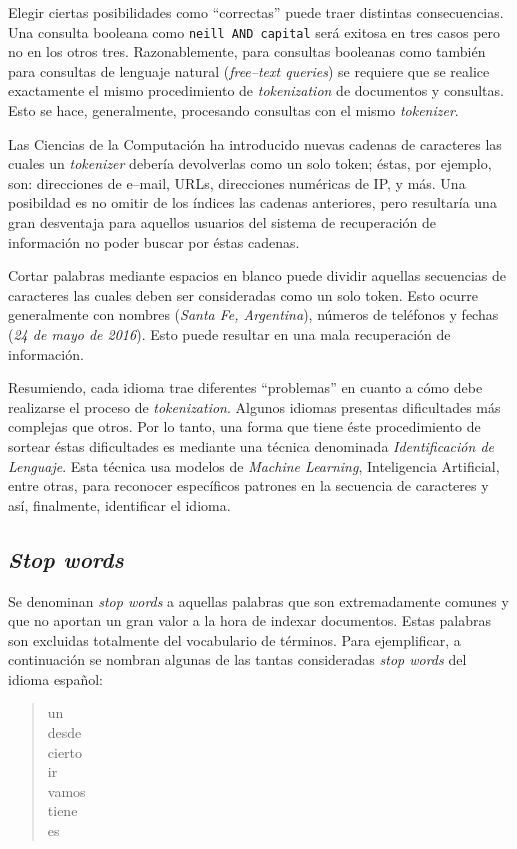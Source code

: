 		Elegir ciertas posibilidades como \enquote{correctas} puede traer distintas consecuencias. Una consulta booleana como \texttt{neill AND capital} será exitosa en tres casos pero no en los otros tres. Razonablemente, para consultas booleanas como también para consultas de lenguaje natural (\textit{free--text queries}) se requiere que se realice exactamente el mismo procedimiento de \textit{tokenization} de documentos y consultas. Esto se hace, generalmente, procesando consultas con el mismo \textit{tokenizer}. \par
		
		Las Ciencias de la Computación ha introducido nuevas cadenas de caracteres las cuales un \textit{tokenizer} debería devolverlas como un solo token; éstas, por ejemplo, son: direcciones de e--mail, URLs, direcciones numéricas de IP, y más. Una posibildad es no omitir de los índices las cadenas anteriores, pero resultaría una gran desventaja para aquellos usuarios del sistema de recuperación de información no poder buscar por éstas cadenas. \par
		
		Cortar palabras mediante espacios en blanco puede dividir aquellas secuencias de caracteres las cuales deben ser consideradas como un solo token. Esto ocurre generalmente con nombres (\textit{Santa Fe, Argentina}), números de teléfonos y fechas (\textit{24 de mayo de 2016}). Esto puede resultar en una mala recuperación de información. \par
		
		Resumiendo, cada idioma trae diferentes \enquote{problemas} en cuanto a cómo debe realizarse el proceso de \textit{tokenization}. Algunos idiomas presentas dificultades más complejas que otros. Por lo tanto, una forma que tiene éste procedimiento de sortear éstas dificultades es mediante una técnica denominada \textit{Identificación de Lenguaje}. Esta técnica usa modelos de \textit{Machine Learning}, Inteligencia Artificial, entre otras, para reconocer específicos patrones en la secuencia de caracteres y así, finalmente, identificar el idioma.
		
	\subsection{\textit{Stop words}}
		Se denominan \textit{stop words} a aquellas palabras que son extremadamente comunes y que no aportan un gran valor a la hora de indexar documentos. Estas palabras son excluidas totalmente del vocabulario de términos. Para ejemplificar, a continuación se nombran algunas de las tantas consideradas \textit{stop words} del idioma español:
		\begin{quote}
			\begin{ttfamily}
				un \\
				desde \\
				cierto \\
				ir \\
				vamos \\
				tiene \\
				es				
			\end{ttfamily}
		\end{quote}
		
